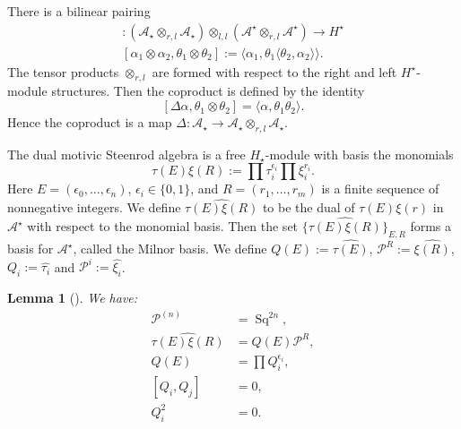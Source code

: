 \documentclass[11pt,hyp]{nyjm}
\newcommand{\A}{\mathcal{A}}
\newcommand{\PP}{\mathcal{P}}
\newcommand{\tensor}{\otimes}
\newcommand{\Sq}{\operatorname{Sq}}
\theoremstyle{theoremstyle}
\newtheorem{lemma}[theorem]{Lemma}
\theoremstyle{definition}
\theoremstyle{theoremstyle}
\begin{document}
There is a bilinear pairing
\begin{align*}
  [-, -]:
  (\A_\star \tensor_{r,l} \A_\star)
  \tensor_{l, l}
  (\A^\star \tensor_{r,l} \A^\star)
  \to
  H^\star \\
  [\alpha_1 \tensor \alpha_2, \theta_1 \tensor \theta_2]
  := \langle\alpha_1, \theta_1 \langle\theta_2, \alpha_2 \rangle \rangle.
\end{align*}
The tensor products $\tensor_{r, l}$ are formed with respect to the right and left $H^\star$-module structures.
Then the coproduct is defined by the identity
\[
[ \Delta \alpha, \theta_1 \tensor \theta_2 ] = 
\langle \alpha, \theta_1 \theta_2 \rangle.
\]
Hence the coproduct is a map $\Delta : \A_\star \to \A_\star \tensor_{r,l} \A_\star$.

The dual motivic Steenrod algebra is a free $H_\star$-module with basis the monomials
\[
\tau(E)\xi(R) := \prod \tau_i^{\epsilon_i}\prod \xi_{i}^{r_i}.
\]
Here $E = (\epsilon_0, \dots, \epsilon_n)$, $\epsilon_i \in \{0, 1\}$,
and $R = (r_1, \dots, r_m)$ is a finite sequence of nonnegative integers.
We define $\widehat{\tau(E)\xi(R)}$ to be the dual of $\tau(E)\xi(r)$ in $\A^\star$ with respect to the monomial basis.
Then the set $\{\widehat{\tau(E)\xi(R)}\}_{E,R}$ forms a basis for $\A^\star$, called the Milnor basis.
We define $Q(E) := \widehat{\tau(E)}$, $\PP^R := \widehat{\xi(R)}$, $Q_i := \widehat{\tau_i}$ and $\PP^i := \widehat{\xi_i}$.
\begin{lemma}[]
  \label{known}
  We have:
  \begin{align*}
    \PP^{(n)} &= \Sq^{2n}, \\
    \widehat{\tau(E)\xi(R)} &= Q(E)\PP^R, \\
    Q(E) &= \prod Q_{i}^{\epsilon_i}, \\
    [Q_i, Q_j] &= 0, \\
    Q_i^2 &= 0.
  \end{align*}
\end{lemma}
\end{document}

